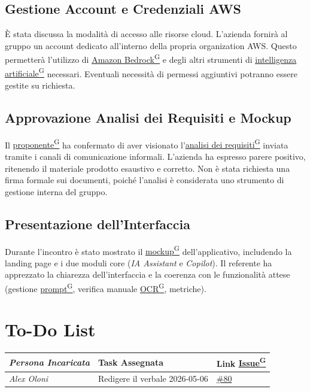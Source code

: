 \documentclass[a4paper,12pt]{article}
\providecommand{\glslink}[2]{\href{https://alittlebyte-19.github.io/Documentazione/glossario.html\#gls-#1}{\underline{#2}\textsuperscript{\scriptsize G}}}
\begin{document}
\subsection{Gestione Account e Credenziali AWS}
È stata discussa la modalità di accesso alle risorse cloud. L'azienda fornirà al gruppo un account dedicato all'interno della propria organization AWS. Questo permetterà l'utilizzo di \glslink{amazon-bedrock}{Amazon Bedrock} e degli altri strumenti di \glslink{intelligenza-artificiale-ai}{intelligenza artificiale} necessari. Eventuali necessità di permessi aggiuntivi potranno essere gestite su richiesta.

\subsection{Approvazione Analisi dei Requisiti e Mockup}
Il \glslink{committente-proponente}{proponente} ha confermato di aver visionato l'\glslink{analisi-dei-requisiti-adr}{analisi dei requisiti} inviata tramite i canali di comunicazione informali. L'azienda ha espresso parere positivo, ritenendo il materiale prodotto esaustivo e corretto. Non è stata richiesta una firma formale sui documenti, poiché l'analisi è considerata uno strumento di gestione interna del gruppo.

\subsection{Presentazione dell'Interfaccia}
Durante l'incontro è stato mostrato il \glslink{mockup}{mockup} dell'applicativo, includendo la landing page e i due moduli core (\textit{IA Assistant} e \textit{Copilot}). Il referente ha apprezzato la chiarezza dell'interfaccia e la coerenza con le funzionalità attese (gestione \glslink{prompt}{prompt}, verifica manuale \glslink{ocr-riconoscimento-ottico-dei-caratteri}{OCR}, metriche).

\section{To-Do List}
\begin{table}[h]
    \centering
    \begin{tabular}{|l|p{5cm}|l|}
    \hline
        \rowcolor{lightgray}\textit{\textbf{Persona Incaricata}}  & \textbf{Task Assegnata} &\textbf{Link \glslink{issue}{Issue}} \\
    \hline
        \textit{Alex Oloni} & Redigere il verbale 2026-05-06 & \href{https://github.com/aLittleByte-19/Documentazione/issues/80}{\#80}\\
    \hline
    \end{tabular}
\end{table}
\end{document}
